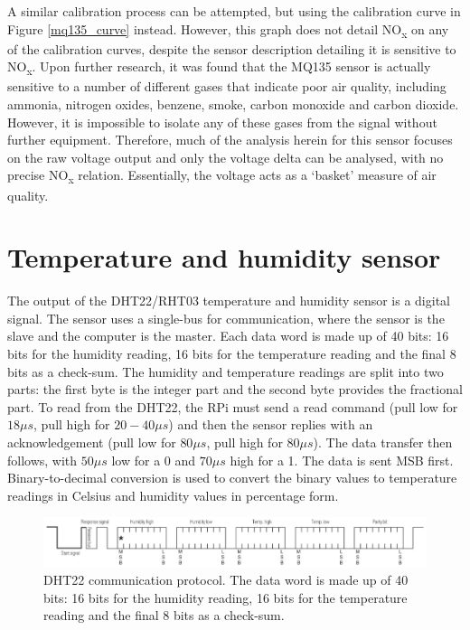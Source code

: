 \documentclass[11pt,twosided,a4paper]{report}
\begin{document}
A similar calibration process can be attempted, but using the calibration curve in Figure \ref{mq135_curve} instead. However, this graph does not detail NO\textsubscript{x} on any of the calibration curves, despite the sensor description detailing it is sensitive to NO\textsubscript{x}. Upon further research, it was found that the MQ135 sensor is actually sensitive to a number of different gases that indicate poor air quality, including ammonia, nitrogen oxides, benzene, smoke, carbon monoxide and carbon dioxide. However, it is impossible to isolate any of these gases from the signal without further equipment. Therefore, much of the analysis herein for this sensor focuses on the raw voltage output and only the voltage delta can be analysed, with no precise NO\textsubscript{x} relation. Essentially, the voltage acts as a `basket' measure of air quality.

\section{Temperature and humidity sensor}

The output of the DHT22/RHT03 temperature and humidity sensor is a digital signal. The sensor uses a single-bus for communication, where the sensor is the slave and the computer is the master. Each data word is made up of 40 bits: 16 bits for the humidity reading, 16 bits for the temperature reading and the final 8 bits as a check-sum. The humidity and temperature readings are split into two parts: the first byte is the integer part and the second byte provides the fractional part. To read from the DHT22, the RPi must send a read command (pull low for $18\mu s$, pull high for $20-40\mu s$) and then the sensor replies with an acknowledgement (pull low for $80\mu s$, pull high for $80\mu s$). The data transfer then follows, with $50\mu s$ low for a 0 and $70\mu s$ high for a 1. The data is sent MSB first. Binary-to-decimal conversion is used to convert the binary values to temperature readings in Celsius and humidity values in percentage form.

\begin{figure}[!tb]
\centering
\includegraphics[width=1\textwidth]{images/dht22_data}
\caption[DHT22 communication protocol.]{DHT22 communication protocol. The data word is made up of 40 bits: 16 bits for the humidity reading, 16 bits for the temperature reading and the final 8 bits as a check-sum.}
\label{dht22_data}
\end{figure}
\end{document}
